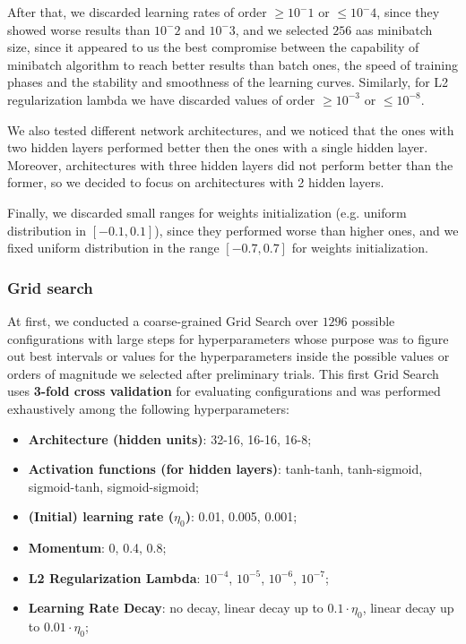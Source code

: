 After that, we discarded learning rates of order $ \geq 10^-1$ or $\leq 10^-4$, since they showed worse results than $10^-2$ and $10^-3$, and we selected $256$ aas minibatch size, since it appeared to us the best compromise between the capability of minibatch algorithm to reach better results than batch ones, the speed of training phases and the stability and smoothness of the learning curves. Similarly, for L2 regularization lambda we have discarded values of order $\ge 10^{-3}$ or $\le 10^{-8}$.

We also tested different network architectures, and we noticed that the ones with two hidden layers performed better then the ones with a single hidden layer. Moreover, architectures with three hidden layers did not perform better than the former, so we decided to focus on architectures with 2 hidden layers.

Finally, we discarded small ranges for weights initialization (e.g. uniform distribution in $[-0.1, 0.1]$), since they performed worse than higher ones,
and we fixed uniform distribution in the range $[-0.7, 0.7]$ for weights initialization.

\subsubsection{Grid search}

At first, we conducted a coarse-grained Grid Search over $1296$ possible configurations with large steps for hyperparameters whose purpose was to figure out best intervals or values for the hyperparameters inside the possible values or orders of magnitude we selected after preliminary trials. This first Grid Search uses \textbf{3-fold cross validation} for evaluating configurations and was performed exhaustively among the following hyperparameters:
\begin{itemize}
    \item \textbf{Architecture (hidden units)}: 32-16, 16-16, 16-8;
    \item \textbf{Activation functions (for hidden layers)}: tanh-tanh, tanh-sigmoid, sigmoid-tanh, sigmoid-sigmoid;
    \item \textbf{(Initial) learning rate ($\eta_0$)}: 0.01, 0.005, 0.001;
    \item \textbf{Momentum}: 0, 0.4, 0.8;
    \item \textbf{L2 Regularization Lambda}: $10^{-4}$, $10^{-5}$, $10^{-6}$, $10^{-7}$;
    \item \textbf{Learning Rate Decay}: no decay, linear decay up to $0.1 \cdot \eta_0$, linear decay up to $0.01 \cdot \eta_0$;
\end{itemize}

